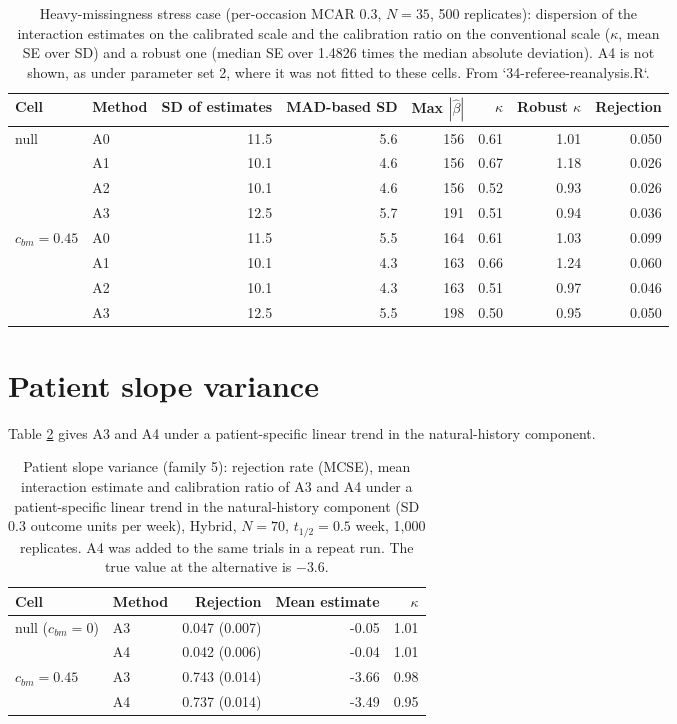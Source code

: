 \documentclass[
  11pt,
]{article}
\begin{document}
\begin{table}
\centering
\caption{\label{tab:heavy-missing}Heavy-missingness stress case (per-occasion MCAR 0.3,
      $N = 35$, 500 replicates): dispersion of the interaction
      estimates on the calibrated scale and the calibration ratio on
      the conventional scale ($\kappa$, mean SE over SD) and a robust
      one (median SE over 1.4826 times the median absolute
      deviation). A4 is not shown, as under parameter set 2, where it
      was not fitted to these cells. From
      `34-referee-reanalysis.R`.}
\centering
\fontsize{9}{11}\selectfont
\begin{tabular}[t]{llrrrrrr}
\toprule
Cell & Method & SD of estimates & MAD-based SD & Max $|\hat\beta|$ & $\kappa$ & Robust $\kappa$ & Rejection\\
\midrule
null & A0 & 11.5 & 5.6 & 156 & 0.61 & 1.01 & 0.050\\
 & A1 & 10.1 & 4.6 & 156 & 0.67 & 1.18 & 0.026\\
 & A2 & 10.1 & 4.6 & 156 & 0.52 & 0.93 & 0.026\\
 & A3 & 12.5 & 5.7 & 191 & 0.51 & 0.94 & 0.036\\
$c_{bm} = 0.45$ & A0 & 11.5 & 5.5 & 164 & 0.61 & 1.03 & 0.099\\
 & A1 & 10.1 & 4.3 & 163 & 0.66 & 1.24 & 0.060\\
 & A2 & 10.1 & 4.3 & 163 & 0.51 & 0.97 & 0.046\\
 & A3 & 12.5 & 5.5 & 198 & 0.50 & 0.95 & 0.050\\
\bottomrule
\end{tabular}
\end{table}

\section{Patient slope variance}\label{patient-slope-variance}

Table \ref{tab:stage5-slope} gives A3 and A4 under a
patient-specific linear trend in the natural-history component.

\begin{table}
\centering
\caption{\label{tab:stage5-slope}Patient slope variance (family 5): rejection rate
      (MCSE), mean interaction estimate and calibration ratio of A3
      and A4 under a patient-specific linear trend in the
      natural-history component (SD 0.3 outcome units per week),
      Hybrid, $N = 70$, $t_{1/2} = 0.5$ week, 1{,}000 replicates. A4
      was added to the same trials in a repeat run. The true value at the
      alternative is $-3.6$.}
\centering
\fontsize{9}{11}\selectfont
\begin{tabular}[t]{llrrr}
\toprule
Cell & Method & Rejection & Mean estimate & $\kappa$\\
\midrule
null ($c_{bm} = 0$) & A3 & 0.047 (0.007) & -0.05 & 1.01\\
 & A4 & 0.042 (0.006) & -0.04 & 1.01\\
$c_{bm} = 0.45$ & A3 & 0.743 (0.014) & -3.66 & 0.98\\
 & A4 & 0.737 (0.014) & -3.49 & 0.95\\
\bottomrule
\end{tabular}
\end{table}
\end{document}
